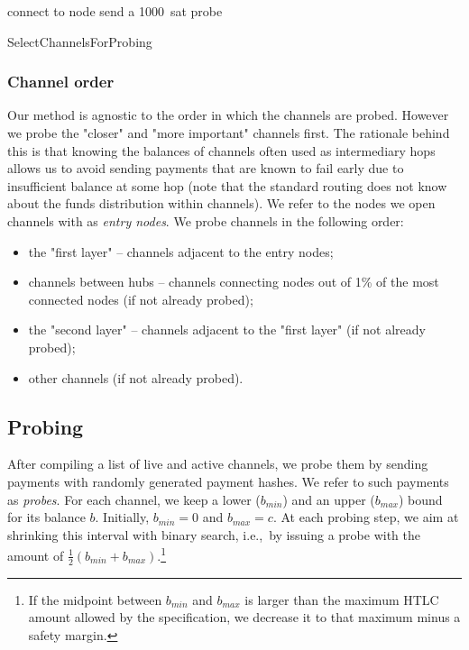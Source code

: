 \begin{algorithm}
	 {
		connect to node\;
	}
	 {
		send a 1000~sat probe\;
	}
	\caption{SelectChannelsForProbing}
	\label{alg:select-channels}
\end{algorithm}


\subsubsection*{Channel order}
Our method is agnostic to the order in which the channels are probed.
However we probe the "closer" and "more important" channels first.
The rationale behind this is that knowing the balances of channels often used as intermediary hops allows us to avoid sending payments that are known to fail early due to insufficient balance at some hop (note that the standard routing does not know about the funds distribution within channels).
We refer to the nodes we open channels with as \textit{entry nodes}.
We probe channels in the following order:

\begin{itemize}
	\item the "first layer" -- channels adjacent to the entry nodes;
	\item channels between hubs -- channels connecting nodes out of 1\% of the most connected nodes (if not already probed);
	\item the "second layer" -- channels adjacent to the "first layer" (if not already probed);
	\item other channels (if not already probed).
\end{itemize}


\subsection{Probing}

After compiling a list of live and active channels, we probe them by sending payments with randomly generated payment hashes.
We refer to such payments as \textit{probes}.
For each channel, we keep a lower ($b_{min}$) and an upper ($b_{max}$) bound for its balance $b$.
Initially, $b_{min}=0$ and $b_{max}=c$.
At each probing step, we aim at shrinking this interval with binary search, i.e.,~by issuing a probe with the amount of $\frac{1}{2} (b_{min} + b_{max})$.\footnote{If the midpoint between $b_{min}$ and $b_{max}$ is larger than the maximum HTLC amount allowed by the specification, we decrease it to that maximum minus a safety margin.}

